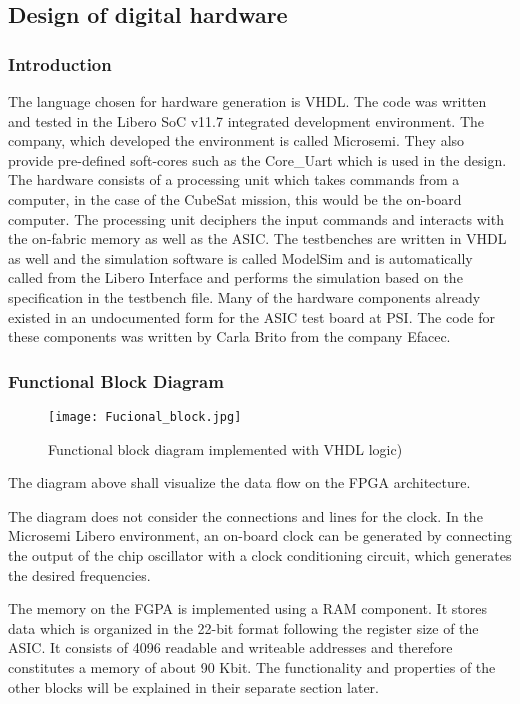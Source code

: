 \subsection{Design of digital hardware}
\label{sec:hardwaredesign}
\subsubsection{Introduction}

The language chosen for hardware generation is VHDL. The code was written and tested in the Libero SoC v11.7 integrated development environment. The company, which developed the environment is called Microsemi. They also provide pre-defined soft-cores such as the Core\_Uart which is used in the design. The hardware consists of a processing unit which takes commands from a computer, in the case of the CubeSat mission, this would be the on-board computer. The processing unit deciphers the input commands and interacts with the on-fabric memory as well as the ASIC. The testbenches are written in VHDL as well and the simulation software is called ModelSim and is automatically called from the Libero Interface and performs the simulation based on the specification in the testbench file. Many of the hardware components already existed in an undocumented form for the ASIC test board at PSI. The code for these components was written by Carla Brito from the company Efacec.


\subsubsection{Functional Block Diagram}

\begin{figure}[H]
    \centering
    \texttt{[image: Fucional\_block.jpg]}
    \caption[]{Functional block diagram implemented with VHDL logic) }
    \label{fig:Functional_block}
\end{figure}

The diagram above shall visualize the data flow on the FPGA architecture.

The diagram does not consider the connections and lines for the clock. In the Microsemi Libero environment, an on-board clock can be generated by connecting the output of the chip oscillator with a clock conditioning circuit, which generates the desired frequencies.
\newline

The memory on the FGPA is implemented using a RAM component. It stores data which is organized in the 22-bit format following the register size of the ASIC. It consists of 4096 readable and writeable addresses and therefore constitutes a memory of about 90 Kbit. The functionality and properties of the other blocks will be explained in their separate section later.
\newline

